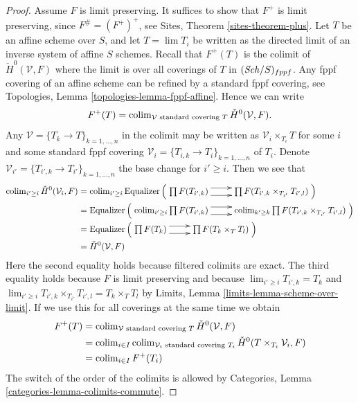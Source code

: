 \begin{proof}
Assume $F$ is limit preserving.
It suffices to show that $F^+$ is limit preserving, since
$F^\# = (F^+)^+$, see
Sites, Theorem \ref{sites-theorem-plus}.
Let $T$ be an affine scheme over $S$, and let $T = \lim T_i$ be written
as the directed limit of an inverse system of affine $S$ schemes.
Recall that $F^+(T)$ is the colimit of $\check H^0(\mathcal{V}, F)$
where the limit is over all coverings of $T$ in $(\mathit{Sch}/S)_{fppf}$.
Any fppf covering of an affine scheme can be refined by a standard
fppf covering, see
Topologies, Lemma \ref{topologies-lemma-fppf-affine}.
Hence we can write
$$
F^+(T)
=
\mathop{\mathrm{colim}}\nolimits_{\mathcal{V}\text{ standard covering }T}
\check H^0(\mathcal{V}, F).
$$
Any $\mathcal{V} = \{T_k \to T\}_{k = 1, \ldots, n}$
in the colimit may be written as
$\mathcal{V}_i \times_{T_i} T$ for some $i$ and some standard fppf covering
$\mathcal{V}_i = \{T_{i, k} \to T_i\}_{k = 1, \ldots, n}$ of $T_i$.
Denote $\mathcal{V}_{i'} = \{T_{i', k} \to T_{i'}\}_{k = 1, \ldots, n}$
the base change for $i' \geq i$. Then we see that
\begin{align*}
\colim_{i' \geq i} \check H^0(\mathcal{V}_i, F)
& =
\colim_{i' \geq i}
\text{Equalizer}
\left(
\xymatrix{
\prod F(T_{i', k})
\ar@<1ex>[r] \ar@<-1ex>[r] &
\prod F(T_{i', k} \times_{T_{i'}} T_{i', l})
}
\right)
\\
& =
\text{Equalizer}
\left(
\xymatrix{
\colim_{i' \geq i}
\prod F(T_{i', k})
\ar@<1ex>[r] \ar@<-1ex>[r] &
\colim_{k' \geq k}
\prod F(T_{i', k} \times_{T_{i'}} T_{i', l})
}
\right)
\\
& =
\text{Equalizer}
\left(
\xymatrix{
\prod F(T_k)
\ar@<1ex>[r] \ar@<-1ex>[r] &
\prod F(T_k \times_T T_l)
}
\right)
\\
& =
\check H^0(\mathcal{V}, F)
\end{align*}
Here the second equality holds because filtered colimits are exact.
The third equality holds because $F$ is limit preserving and because
$\lim_{i' \geq i} T_{i', k} = T_k$ and
$\lim_{i' \geq i} T_{i', k} \times_{T_{i'}} T_{i', l} = T_k \times_T T_l$
by Limits, Lemma \ref{limits-lemma-scheme-over-limit}.
If we use this for all coverings at the same time we obtain
\begin{align*}
F^+(T)
& =
\mathop{\mathrm{colim}}\nolimits_{\mathcal{V}\text{ standard covering }T} \check H^0(\mathcal{V}, F) \\
& =
\mathop{\mathrm{colim}}\nolimits_{i \in I}
\mathop{\mathrm{colim}}\nolimits_{\mathcal{V}_i\text{ standard covering }T_i}
\check H^0(T \times_{T_i}\mathcal{V}_i, F) \\
& =
\mathop{\mathrm{colim}}\nolimits_{i \in I} F^+(T_i)
\end{align*}
The switch of the order of the colimits is allowed by
Categories, Lemma \ref{categories-lemma-colimits-commute}.
\end{proof}

